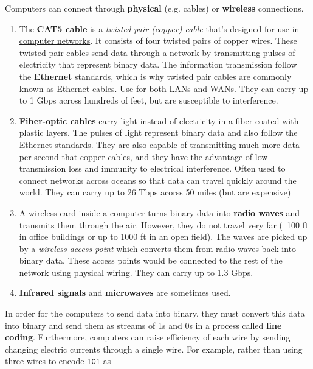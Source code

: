 \documentclass{article}
\newcounter{example}[section]
\newcounter{code}[section]
\begin{document}
    Computers can connect through \textbf{physical} (e.g. cables) or \textbf{wireless} connections. 

    \begin{enumerate}
      \item The \textbf{CAT5 cable} is a \textit{twisted pair (copper) cable} that's designed for use in \hyperref[def:computer-network-2]{computer networks}. It consists of four twisted pairs of copper wires. These twisted pair cables send data through a network by transmitting pulses of electricity that represent binary data. The information transmission follow the \textbf{Ethernet} standards, which is why twisted pair cables are commonly known as Ethernet cables. Use for both LANs and WANs. They can carry up to 1 Gbps across hundreds of feet, but are susceptible to interference. 

      \item \textbf{Fiber-optic cables} carry light instead of electricity in a fiber coated with plastic layers. The pulses of light represent binary data and also follow the Ethernet standards. They are also capable of transmitting much more data per second that copper cables, and they have the advantage of low transmission loss and immunity to electrical interference. Often used to connect networks across oceans so that data can travel quickly around the world. They can carry up to 26 Tbps acorss 50 miles (but are expensive)

      \item A wireless card inside a computer turns binary data into \textbf{radio waves} and transmits them through the air. However, they do not travel very far (~100 ft in office buildings or up to 1000 ft in an open field). The waves are picked up by a \textit{wireless \hyperref[def:access-point]{access point}} which converts them from radio waves back into binary data. These access points would be connected to the rest of the network using physical wiring. They can carry up to 1.3 Gbps. 

      \item \textbf{Infrared signals} and \textbf{microwaves} are sometimes used. 
    \end{enumerate}

    In order for the computers to send data into binary, they must convert this data into binary and send them as streams of 1s and 0s in a process called \textbf{line coding}. Furthermore, computers can raise efficiency of each wire by sending changing electric currents through a single wire. For example, rather than using three wires to encode $\texttt{101}$ as 
\end{document}
